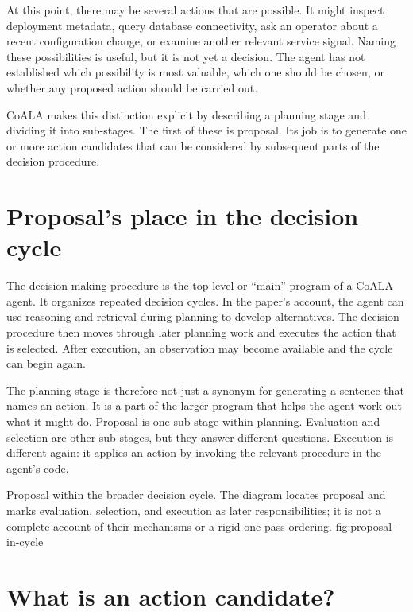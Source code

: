 At this point, there may be several actions that are possible. It might inspect deployment metadata, query database connectivity, ask an operator about a recent configuration change, or examine another relevant service signal. Naming these possibilities is useful, but it is not yet a decision. The agent has not established which possibility is most valuable, which one should be chosen, or whether any proposed action should be carried out.

CoALA makes this distinction explicit by describing a planning stage and dividing it into sub-stages. The first of these is proposal. Its job is to generate one or more action candidates that can be considered by subsequent parts of the decision procedure.

\section{Proposal's place in the decision cycle}
\label{sec:proposal-decision-cycle}

The decision-making procedure is the top-level or ``main'' program of a CoALA agent. It organizes repeated decision cycles. In the paper's account, the agent can use reasoning and retrieval during planning to develop alternatives. The decision procedure then moves through later planning work and executes the action that is selected. After execution, an observation may become available and the cycle can begin again.

The planning stage is therefore not just a synonym for generating a sentence that names an action. It is a part of the larger program that helps the agent work out what it might do. Proposal is one sub-stage within planning. Evaluation and selection are other sub-stages, but they answer different questions. Execution is different again: it applies an action by invoking the relevant procedure in the agent's code.

  {Proposal within the broader decision cycle. The diagram locates proposal and marks evaluation, selection, and execution as later responsibilities; it is not a complete account of their mechanisms or a rigid one-pass ordering.}
  {fig:proposal-in-cycle}

\section{What is an action candidate?}
\label{sec:action-candidate}

